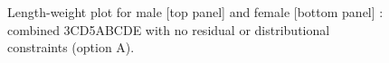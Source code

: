 \begin{figure}[htp]
\captionsetup[subfigure]{labelformat=empty}
\begin{center}
\newline
\end{center}
\vspace{-10mm}
\caption{Length-weight plot for male [top panel] and female [bottom panel] \fishname: combined 3CD5ABCDE with no residual or distributional constraints (option A).}
\label{fig:lwOptionA}
\end{figure}

